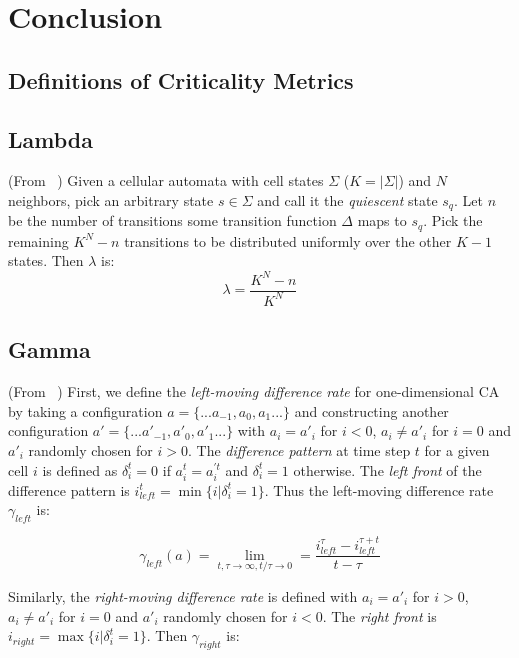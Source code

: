 \documentclass[a4paper,11pt]{report}
\begin{document}
\chapter{Conclusion}
\label{ch:conclusion}

\begin{appendices}

\chapter{Definitions of Criticality Metrics}
\label{app:Defs}

\section{Lambda}
\label{appA:lambda}
(From \citeauthor{la90}~\cite{la90}) Given a cellular automata with cell states $\Sigma$ ($K = |\Sigma|$) and $N$ neighbors, pick an arbitrary state $s \in \Sigma$ and call it the \textit{quiescent} state $s_q$. Let $n$ be the number of transitions some transition function $\Delta$ maps to $s_q$. Pick the remaining $K^N - n$ transitions to be distributed uniformly over the other $K-1$ states. Then $\lambda$ is:
\begin{equation}
\lambda = \frac{K^N - n}{K^N} 
\end{equation}

\section{Gamma}
\label{appA:gamma}
(From \citeauthor{li90b}~\cite{li90b}) First, we define the \textit{left-moving difference rate} for one-dimensional CA by taking a configuration $a = \{...a_{-1}, a_0, a_1...\}$ and constructing another configuration $a' = \{...a'_{-1}, a'_0, a'_1...\}$ with $a_i = a'_i$ for $i < 0$, $a_i \ne a'_i$ for $i=0$ and $a'_i$ randomly chosen for $i > 0$. The \textit{difference pattern} at time step $t$ for a given cell $i$ is defined as $\delta_i^t = 0$ if $a_i^t=a_i^{'t}$ and $\delta_i^t = 1$ otherwise. The \textit{left front} of the difference pattern is $i_{left}^t = \min\{i | \delta_i^t = 1\}$. Thus the left-moving difference rate $\gamma_{left}$ is:

\begin{equation}
\gamma_{left}(a) = \lim_{t, \tau \to \infty, t/\tau \to 0} = \frac{i_{left}^\tau - i_{left}^{\tau + t}}{t - \tau}
\end{equation}

Similarly, the \textit{right-moving difference rate} is defined with $a_i = a'_i$ for $i > 0$, $a_i \ne a'_i$ for $i=0$ and $a'_i$ randomly chosen for $i < 0$. The \textit{right front} is $i_{right} = \max\{i | \delta_i^t = 1\}$. Then $\gamma_{right}$ is:


\end{appendices}
\end{document}
